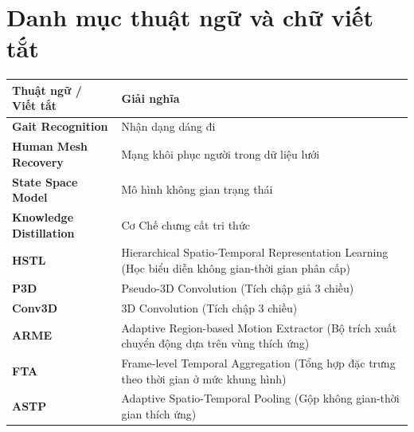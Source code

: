 \chapter{Danh mục thuật ngữ và chữ viết tắt}
\label{Appendix1}

\begin{table}[h]
    \centering
    \begin{tabular}{|l|p{10cm}|}
        \hline
        \textbf{Thuật ngữ / Viết tắt}   & \textbf{Giải nghĩa}                                                                                \\
        \hline
        \textbf{Gait Recognition}       & Nhận dạng dáng đi                                                                                  \\
        \hline
        \textbf{Human Mesh Recovery}    & Mạng khôi phục người trong dữ liệu lưới                                                            \\
        \hline
        \textbf{State Space Model}      & Mô hình không gian trạng thái                                                                      \\
        \hline
        \textbf{Knowledge Distillation} & Cơ Chế chưng cất tri thức                                                                          \\
        \hline
        \textbf{HSTL}                   & Hierarchical Spatio-Temporal Representation Learning (Học biểu diễn không gian-thời gian phân cấp) \\
        \hline
        \textbf{P3D}                    & Pseudo-3D Convolution (Tích chập giả 3 chiều)                                                      \\
        \hline
        \textbf{Conv3D}                 & 3D Convolution (Tích chập 3 chiều)                                                                 \\
        \hline
        \textbf{ARME}                   & Adaptive Region-based Motion Extractor (Bộ trích xuất chuyển động dựa trên vùng thích ứng)         \\
        \hline
        \textbf{FTA}                    & Frame-level Temporal Aggregation (Tổng hợp đặc trưng theo thời gian ở mức khung hình)              \\
        \hline
        \textbf{ASTP}                   & Adaptive Spatio-Temporal Pooling (Gộp không gian-thời gian thích ứng)                              \\
        \hline

\end{tabular}
\end{table}
